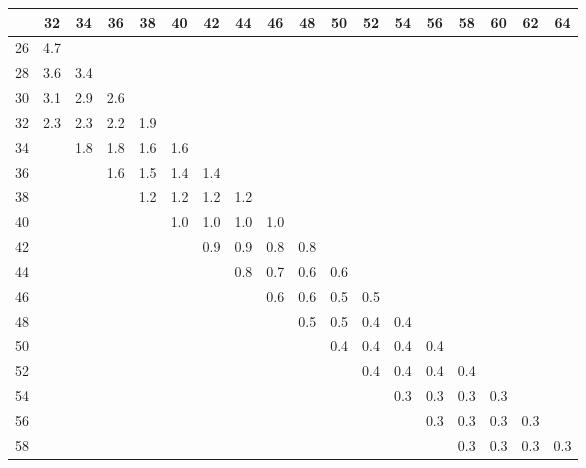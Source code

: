 \begin{table}
\begin{center}
\begin{tabular}{|l|ccccccccccccccccc|}\hline 
   & 32 & 34 & 36 & 38 & 40 & 42 & 44 & 46 & 48 & 50 & 52 & 54 & 56 & 58 & 60 & 62 & 64 \\ \hline
26 &  4.7  &    &    &    &    &    &    &    &    &    &    &    &    &    &    &    &   \\   
28 &  3.6  & 3.4   &    &    &    &    &    &    &    &    &    &    &    &    &    &    &   \\   
30 & 3.1   & 2.9   & 2.6   &    &    &    &    &    &    &    &    &    &    &    &    &    &   \\
32 &  2.3  & 2.3   & 2.2   &  1.9  &   &    &    &    &    &    &    &    &    &    &    &    &   \\
34 &    & 1.8   & 1.8   & 1.6   & 1.6   &    &    &    &    &    &    &    &    &    &    &    &   \\
36 &    &    & 1.6   & 1.5   & 1.4   & 1.4   &    &    &    &    &    &    &    &    &    &    &   \\
38 &    &    &    & 1.2   &  1.2  & 1.2   &  1.2  &    &    &    &    &    &    &    &    &    &   \\
40 &    &    &    &    & 1.0   &  1.0  & 1.0   & 1.0   &    &    &    &    &    &    &    &    &   \\
42 &    &    &    &    &    & 0.9   & 0.9   & 0.8   & 0.8   &    &    &    &    &    &    &    &   \\
44 &    &    &    &    &    &    & 0.8   & 0.7   & 0.6   &  0.6  &    &    &    &    &    &    &    \\
46 &    &    &    &    &    &    &    & 0.6   & 0.6   & 0.5   & 0.5   &    &    &    &    &    &   \\
48 &    &    &    &    &    &    &    &    & 0.5   & 0.5   & 0.4   & 0.4   &    &    &    &    &    \\
50 &    &    &    &    &    &    &    &    &    & 0.4   & 0.4   & 0.4   & 0.4   &    &    &    &   \\
52 &    &    &    &    &    &    &    &    &    &    & 0.4   & 0.4   & 0.4   & 0.4   &    &    &   \\
54 &    &    &    &    &    &    &    &    &    &    &    & 0.3   & 0.3   & 0.3   & 0.3   &    &    \\
56 &    &    &    &    &    &    &    &    &    &    &    &    & 0.3   & 0.3   & 0.3   &  0.3  &   \\
58 &    &    &    &    &    &    &    &    &    &    &    &    &    & 0.3   & 0.3   & 0.3   & 0.3  \\

\end{tabular}
\end{center}
\end{table}
